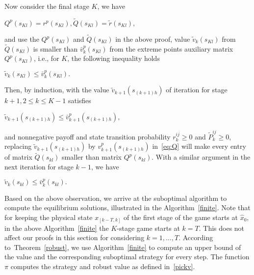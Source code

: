 \begin{pf}
Now consider the final stage $K$, we have
\\\centerline{$
Q^p(s_{Kl})=r^p(s_{Kl}), \tilde{Q}(s_{Kl})=\tilde{r}(s_{Kl}),
$}
and use the $Q^p(s_{Kl})$ and $\tilde{Q}(s_{Kl})$ in the above proof, value $\tilde{v}_k(s_{Kl})$ from $\tilde{Q}(s_{Kl})$ is smaller than $\bar{v}_k^p(s_{Kl})$ from the extreme points auxiliary matrix $Q^p(s_{Kl})$, i.e., for $K$, the following inequality holds
\\\centerline{$
\tilde{v}_k(s_{Kl}) \leqslant \bar{v}_k^p(s_{Kl}).
$}
Then, by induction, with the value $\tilde{v}_{k+1}(s_{(k+1)h})$ of iteration for stage $k+1, 2\leqslant k \leqslant K-1$ satisfies %
\\\centerline{$\tilde{v}_{k+1}(s_{(k+1)h})\leqslant \bar{v}_{k+1}^{p}(s_{(k+1)h}),$} 
and nonnegative payoff and state transition probability $r_{k}^{ij}\geqslant 0$ and $\tilde{P}_{k}^{ij}\geqslant 0$, replacing $\tilde{v}_{k+1}(s_{(k+1)h})$ by $v_{k+1}^{p}(s_{(k+1)h})$ in~\eqref{eq:Q} will make every entry of matrix $\tilde{Q}(s_{kl})$ smaller than matrix $Q^{p}(s_{kl})$. 
With a similar argument in the next iteration for stage $k-1$, we have 
\\\centerline{$
\tilde{v}_{k}(s_{kl}) \leqslant \bar{v}_{k}^{p}(s_{kl}).
$}
\end{pf}

Based on the above observation, we arrive at the suboptimal algorithm to compute the equilibrium solutions, illustrated in the Algorithm~\ref{finite}. Note that for keeping the physical state $x_{[k-T,k]}$ of the first stage of the game starts at $\hat{x}_0$, in the above Algorithm~\ref{finite} the $K$-stage game  starts at $k=T$. This does not affect our proofs in this section for considering $k=1,\dots, T$.
According to~Theorem~\ref{robust}, we use Algorithm~\ref{finite} to compute an upper bound of the value and the corresponding suboptimal strategy for every step. The %
function $\pi$ computes the strategy and robust value as defined in~\eqref{pickv}. 

